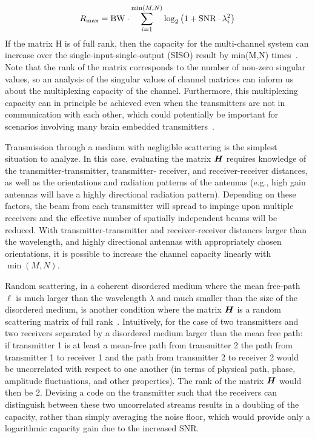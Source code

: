 \[R_{\text{\scriptsize max}} = \text{BW} \cdot \sum_{i=1}^{\min(M,N)} \log_2\left(1+\text{SNR} \cdot \lambda_i^2\right)\]
If the matrix H is of full rank, then the capacity for the multi-channel system can increase over the single-input-single-output (SISO) result by min(M,N) times~\cite{shiu00}.
Note that the rank of the matrix corresponds to the number of non-zero singular values, so an analysis of the singular values of channel matrices can inform us about the multiplexing capacity of the channel.
Furthermore, this multiplexing capacity can in principle be achieved even when the transmitters are not in communication with each other, which could potentially be important for scenarios involving many brain embedded transmitters~\cite{spencer04}.

Transmission through a medium with negligible scattering is the simplest situation to analyze.
In this case, evaluating the matrix $\mat{H}$ requires knowledge of the transmitter-transmitter, transmitter- receiver, and receiver-receiver distances, as well as the orientations and radiation patterns of the antennas (e.g., high gain antennas will have a highly directional radiation pattern).
Depending on these factors, the beam from each transmitter will spread to impinge upon multiple receivers and the effective number of spatially independent beams will be reduced.
With transmitter-transmitter and receiver-receiver distances larger than the wavelength, and highly directional antennas with appropriately chosen orientations, it is possible to increase the channel capacity linearly with $\min(M,N)$.

Random scattering, in a coherent disordered medium where the mean free-path $\ell$ is much larger than the wavelength $\lambda$ and much smaller than the size of the disordered medium, is another condition where the matrix $\mat{H}$ is a random scattering matrix of full rank~\cite{moustakas00,popoff10}.
Intuitively, for the case of two transmitters and two receivers separated by a disordered medium larger than the mean free path:
if transmitter 1 is at least a mean-free path from transmitter 2 the path from transmitter 1 to receiver 1 and the path from transmitter 2 to receiver 2 would be uncorrelated with respect to one another (in terms of physical path, phase, amplitude fluctuations, and other properties).
The rank of the matrix $\mat{H}$ would then be 2.
Devising a code on the transmitter such that the receivers can distinguish between these two uncorrelated streams results in a doubling of the capacity, rather than simply averaging the noise floor, which would provide only a logarithmic capacity gain due to the increased SNR.

